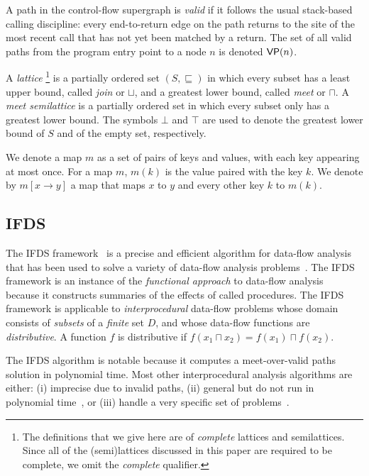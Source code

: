 A path in the control-flow supergraph is \textit{valid} if it follows the usual stack-based calling 
discipline: every end-to-return edge on the path returns
to the site of the most recent call that has not yet been matched by a return. 
The set of all valid paths from the program entry point to
a node $n$ is denoted $\textsf{VP}(n)$.

A \textit{lattice}%
\footnote{The definitions that we give here are of \textit{complete} lattices and semilattices.
Since all of the (semi)lattices discussed in this paper are required to be complete, we omit the
\textit{complete} qualifier.}
is a partially ordered set $(S,\sqsubseteq)$ in which every subset has a least upper bound, called \textit{join} or $\sqcup$, and a greatest lower bound, called \textit{meet} or $\sqcap$.
A \textit{meet semilattice} is a partially ordered set in which every subset only has a greatest lower bound.
The symbols $\bot$ and $\top$ are used to denote the greatest lower bound of $S$ and of the empty set, respectively.

We denote a map $m$ as a set of pairs of keys and values, with each key appearing at most once.
For a map $m$,  $m(k)$ is the value paired with the key $k$. We denote by $m[x\to y]$ a map that maps $x$ to $y$ and every other key $k$ to $m(k)$.

\subsection{IFDS}\label{sec:bgifds}
The IFDS framework~\cite{reps1995precise} is a precise and efficient algorithm for data-flow analysis
that has been used to solve a variety of data-flow analysis problems~\cite{bodden2013spl,naeem2008typestate,DBLP:conf/birthday/KreikerRRSWY13,tripp2009taj}.
The IFDS framework is an instance of the \textit{functional approach} to data-flow analysis~\cite{pnueli1981two}
because it constructs summaries of the effects of called procedures.
The IFDS framework is applicable to \textit{interprocedural} data-flow problems whose domain consists of \textit{subsets} of a \textit{finite} set $D$,
and whose data-flow functions are \textit{distributive}.
A function $f$ is distributive if 
$f(x_1\sqcap x_2)=f(x_1)\sqcap f(x_2)$.

The IFDS algorithm is notable because it computes a meet-over-valid paths solution in polynomial time.
Most other interprocedural analysis algorithms are either: 
  (i) imprecise due to invalid paths,
  (ii) general but do not run in polynomial time~\cite{knoop1992interprocedural,pnueli1981two}, or 
  (iii) handle a very specific set of problems~\cite{knoop1993efficient}.


